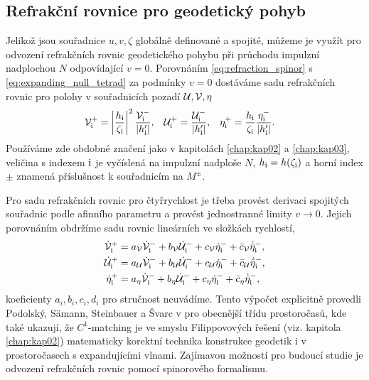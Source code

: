 \subsection{Refrakční rovnice pro geodetický pohyb}
Jelikož jsou souřadnice $u, v, \zeta$ globálně definované a spojité, můžeme je využít pro odvození refrakčních rovnic
geodetického pohybu při průchodu impulzní nadplochou $N$ odpovídající $v = 0$.
Porovnáním \eqref{eq:refraction_spinor} s  \eqref{eq:expanding_null_tetrad} za podmínky $v=0$ dostáváme sadu refrakčních rovnic pro
polohy v souřadnicích pozadí $\mathcal{U}, \mathcal{V}, \eta$
\begin{align}
    \mathcal{V}^+_{\mathrm{i}} &= \left| \frac{h_{\mathrm{i}}}{\zeta_{\mathrm{i}}}\right|^2 \frac{\mathcal{V}^-_{\mathrm{i}}}{\left|{h_{\mathrm{i}}'}\right|}, & \mathcal{U}^+_{\mathrm{i}} &= \frac{\mathcal{U}^-_{\mathrm{i}}}{\left|{h_{\mathrm{i}}'}\right|}, & \eta^+_{\mathrm{i}} &= \frac{h_{\mathrm{i}}}{\zeta_{\mathrm{i}}} \frac{\eta^-_{\mathrm{i}}}{\left|{h'_{\mathrm{i}}}\right|}.
\end{align}
Používáme zde obdobné značení jako v kapitolách \ref{chap:kap02} a \ref{chap:kap03},
veličina s indexem $\mathrm{i}$ je vyčíslená na impulzní nadploše $N$, $h_{\mathrm{i}} = h(\zeta_{\mathrm{i}})$ a horní index $\pm$ znamená příslušnost k souřadnicím na $M^\pm$.

Pro sadu refrakčních rovnic pro čtyřrychlost je třeba provést derivaci spojitých souřadnic podle afinního parametru a provést jednostranné limity $v \to 0$.
Jejich porovnáním obdržíme sadu rovnic lineárních ve složkách rychlostí,
\begin{equation}
    \begin{split}
        \dot{\mathcal{V}}_{\mathrm{i}}^+ &= a_{\mathcal{V}} \dot{\mathcal{V}}_{\mathrm{i}}^- + b_{\mathcal{V}} \dot{\mathcal{U}}_{\mathrm{i}}^- + c_{\mathcal{V}} \dot{\eta}_{\mathrm{i}}^- + \bar{c}_{\mathcal{V}} \dot{\bar{\eta}}_{\mathrm{i}}^-, \\
        \dot{\mathcal{U}}_{\mathrm{i}}^+ &= a_{\mathcal{U}} \dot{\mathcal{V}}_{\mathrm{i}}^- + b_{\mathcal{U}} \dot{\mathcal{U}}_{\mathrm{i}}^- + c_{\mathcal{U}} \dot{\eta}_{\mathrm{i}}^- + \bar{c}_{\mathcal{U}} \dot{\bar{\eta}}_{\mathrm{i}}^-, \\
        \dot{\eta}_{\mathrm{i}}^+ &= a_\eta \dot{\mathcal{V}}_{\mathrm{i}}^- + b_\eta \dot{\mathcal{U}}_{\mathrm{i}}^- + c_\eta \dot{\eta}_{\mathrm{i}}^- + \bar{c}_\eta \dot{\bar{\eta}}_{\mathrm{i}}^-,
    \end{split}
\end{equation}
koeficienty $a_i, b_i, c_i, d_i$ pro stručnost neuvádíme. Tento výpočet explicitně provedli Podolský, Sämann, Steinbauer a Švarc v
\cite{Podolsky:2016mqg} pro obecnější třídu prostoročasů, kde také ukazují, že $C^1$-matching je ve smyslu Filippovových řešení (viz. kapitola \ref{chap:kap02})
matematicky korektní technika konstrukce geodetik i v prostoročasech s expandujícími vlnami.
Zajímavou možností pro budoucí studie je odvození refrakčních rovnic pomocí spinorového formalismu.


